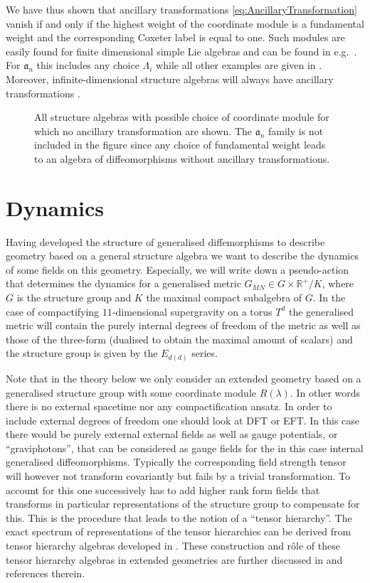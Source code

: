 We have thus shown that ancillary transformations \eqref{eq:AncillaryTransformation} vanish if and only if the highest weight of the coordinate module is a fundamental weight and the corresponding Coxeter label is equal to one. Such modules are easily found for finite dimensional simple Lie algebras and can be found in e.g.\ \cite{Fuchs1997}. For $\mathfrak{a}_n$ this includes any choice $\Lambda_i$ while all other examples are given in . Moreover, infinite-dimensional structure algebras will always have ancillary transformations \cite{CederwallPalmkvist2017}. 

\begin{figure}
    \centering
    \DynkinNoAncillary{}
    \caption{All structure algebras with possible choice of coordinate module for which no ancillary transformation are shown. The $\mathfrak{a}_n$ family is not included in the figure since any choice of fundamental weight leads to an algebra of diffeomorphisms without ancillary transformations.}
    \label{fig:DynkinNoAncillary}
\end{figure}


\section{Dynamics\label{sec:Dynamics}}
Having developed the structure of generalised diffemorphisms to describe geometry based on a general structure algebra we want to describe the dynamics of some fields on this geometry. Especially, we will write down a pseudo-action that determines the dynamics for a generalised metric $G_{MN}\in G\times \mathbb{R}^+/K$, where $G$ is the structure group and $K$ the maximal compact subalgebra of $G$. In the case of compactifying $11$-dimensional supergravity on a torus $T^d$ the generalised metric will contain the purely internal degrees of freedom of the metric as well as those of the three-form (dualised to obtain the maximal amount of scalars) and the structure group is given by the $E_{d(d)}$ series. 

Note that in the theory below we only consider an extended geometry based on a generalised structure group with some coordinate module $R(\lambda)$. In other words there is no external spacetime nor any compactification ansatz. In order to include external degrees of freedom one should look at DFT or EFT. In this case there would be purely external external fields as well as gauge potentials, or ``graviphotons'', that can be considered as gauge fields for the in this case internal generalised diffeomorphisms. Typically the corresponding field strength tensor will however not transform covariantly but fails by a trivial transformation. To account for this one successively has to add higher rank form fields that transforms in particular representations of the structure group to compensate for this. This is the procedure that leads to the notion of a ``tensor hierarchy''. The exact spectrum of representations of the tensor hierarchies can be derived from tensor hierarchy algebras developed in \cite{Palmkvist:2013vya}. These construction and rôle of these tensor hierarchy algebras in extended geometries are further discussed in  \cite{Cederwall:2018aab,Carbone:2018njd} and references therein.

